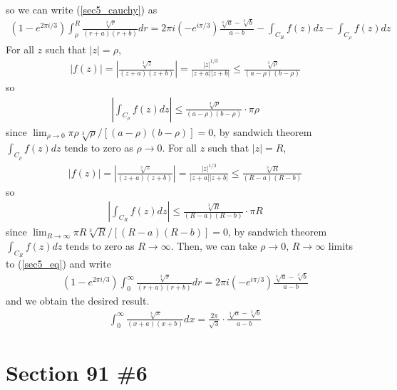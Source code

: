 \documentclass{scrartcl}
\begin{document}
so we can write (\ref{sec5_cauchy}) as
\begin{align}\label{sec5_eq}
  (1 - e^{2\pi i / 3}) \int^R_\rho \frac{\sqrt[3]{r}}{(r + a)(r + b)} dr
  = 2\pi i (-e^{i\pi / 3}) \frac{\sqrt[3]{a} - \sqrt[3]{b}}{a - b} - \int_{C_R} f(z) dz - \int_{C_\rho} f(z) dz
\end{align}
For all \(z\) such that \(|z| = \rho\),
\begin{align*}
  |f(z)|
  = \left| \frac{\sqrt[3]{z}}{(z + a)(z + b)} \right|
  = \frac{|z|^{1 / 3}}{|z + a| |z + b|}
  \leq \frac{\sqrt[3]{\rho}}{(a - \rho)(b - \rho)}
\end{align*}
so
\begin{align*}
  \left| \int_{C_\rho} f(z) dz \right| \leq \frac{\sqrt[3]{\rho}}{(a - \rho)(b - \rho)} \cdot \pi \rho
\end{align*}
since \(\lim_{\rho \to 0} \pi \rho \sqrt[3]{\rho} / [(a - \rho)(b - \rho)] = 0\), by sandwich theorem \(\int_{C_\rho} f(z) dz\) tends to zero as \(\rho \to 0\).
For all \(z\) such that \(|z| = R\),
\begin{align*}
  |f(z)|
  = \left| \frac{\sqrt[3]{z}}{(z + a)(z + b)} \right|
  = \frac{|z|^{1 / 3}}{|z + a| |z + b|}
  \leq \frac{\sqrt[3]{R}}{(R - a)(R - b)}
\end{align*}
so
\begin{align*}
  \left| \int_{C_R} f(z) dz \right| \leq \frac{\sqrt[3]{R}}{(R - a)(R - b)} \cdot \pi R
\end{align*}
since \(\lim_{R \to \infty} \pi R \sqrt[3]{R} / [(R - a)(R - b)] = 0\), by sandwich theorem \(\int_{C_R} f(z) dz\) tends to zero as \(R \to \infty\).
Then, we can take \(\rho \to 0,\, R \to \infty\) limits to (\ref{sec5_eq}) and write
\begin{align*}
  (1 - e^{2\pi i / 3}) \int^\infty_0 \frac{\sqrt[3]{r}}{(r + a)(r + b)} dr = 2\pi i (-e^{i\pi / 3}) \frac{\sqrt[3]{a} - \sqrt[3]{b}}{a - b}
\end{align*}
and we obtain the desired result.
\begin{align*}
  \int^\infty_0 \frac{\sqrt[3]{x}}{(x + a)(x + b)} dx = \frac{2\pi}{\sqrt{3}} \cdot \frac{\sqrt[3]{a} - \sqrt[3]{b}}{a - b}
\end{align*}

\section{Section 91 \#6}
\end{document}
